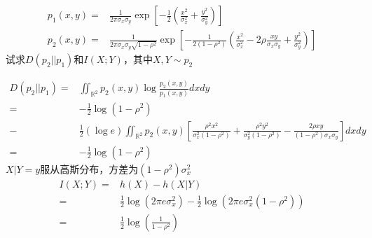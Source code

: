 \documentclass[a4paper]{article}
\begin{document}
\begin{enumerate}[label=\thehwcnt.\arabic*.]
\begin{align*}
p_1(x,y)=& \frac{1}{2\pi \sigma_x\sigma_y}\exp[-\frac{1}{2}(\frac{x^2}{\sigma_x^2}+\frac{y^2}{\sigma_y^2})]\\
p_2(x,y)=& \frac{1}{2\pi \sigma_x\sigma_y\sqrt{1-\rho^2}}\exp[-\frac{1}{2(1-\rho^2)}(\frac{x^2}{\sigma_x^2}-2\rho\frac{xy}{\sigma_x\sigma_y}+\frac{y^2}{\sigma_y^2})]
\end{align*}
试求$D(p_2||p_1)$和$I(X;Y)$，其中$X,Y\sim p_2$
\begin{solution}
\begin{align*}
D(p_2||p_1) = & \iint_{\mathbb{R}^2} p_2(x,y)\log \frac{p_2(x,y)}{p_1(x,y)}dxdy \\
 =&-\frac{1}{2}\log(1-\rho^2)\\
-&\frac{1}{2}(\log e)\iint_{\mathbb{R}^2} p_2(x,y)\left[\frac{\rho^2 x^2}{\sigma_x^2(1-\rho^2)}+\frac{\rho^2 y^2}{\sigma_y^2(1-\rho^2)}-\frac{2\rho xy}{(1-\rho^2)\sigma_x\sigma_y}\right]dxdy\\
=&-\frac{1}{2}\log(1-\rho^2)
\end{align*}
$X|Y=y$服从高斯分布，方差为$(1-\rho^2)\sigma_x^2$
\begin{align*}
I(X;Y) = & h(X)-h(X|Y)\\
= & \frac{1}{2}\log(2\pi e \sigma_x^2) - \frac{1}{2}\log(2\pi e \sigma_x^2(1-\rho^2))\\
= & \frac{1}{2}\log(\frac{1}{1-\rho^2})
\end{align*}

\end{solution}

\end{enumerate}
\end{document}
